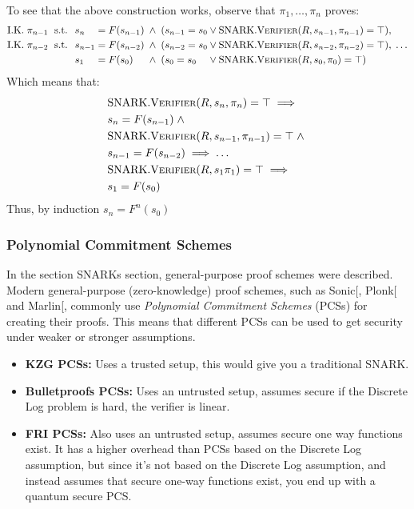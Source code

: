 \documentclass[
]{article}
\providecommand{\tightlist}{%
  \setlength{\itemsep}{0pt}\setlength{\parskip}{0pt}}
\newcommand*{\Verifier}{\mathrm{\text{V\scriptsize ERIFIER}}}
\newcommand*{\SNARKVerifier}{\mathrm{\text{SNARK}}.\Verifier}
\begin{document}
To see that the above construction works, observe that \(\pi_1, \dots,
\pi_n\) proves: \[
\begin{alignedat}{7}
  &\text{I.K.} \; \pi_{n-1} \; &&\text{ s.t. } \; &&s_n     &&= F(s_{n-1}) \; &&\land \; (s_{n-1} = s_0  &&\lor \SNARKVerifier(R, s_{n-1}, \pi_{n-1}) = \top), \\
  &\text{I.K.} \; \pi_{n-2} \; &&\text{ s.t. } \; &&s_{n-1} &&= F(s_{n-2}) \; &&\land \; (s_{n-2} = s_0  &&\lor \SNARKVerifier(R, s_{n-2}, \pi_{n-2}) = \top), \; \dots \\
  &                            &&              \; &&s_1     &&= F(s_0)     \; &&\land \; (s_0 = s_0      &&\lor \SNARKVerifier(R, s_0, \pi_0) = \top)
\end{alignedat}
\] Which means that: \[
\begin{alignedat}{4}
  &\SNARKVerifier(R, s_n, \pi_n) = \top \implies \\
  &s_n = F(s_{n-1}) \; \land \; \\
  &\SNARKVerifier(R, s_{n-1}, \pi_{n-1}) = \top \; \land \; \\
  &s_{n-1} = F(s_{n-2}) \implies \dots \\
  &\SNARKVerifier(R, s_1 \pi_1) = \top \implies \\
  &s_1 = F(s_0)
\end{alignedat}
\] Thus, by induction \(s_n = F^n(s_0)\)

\subsubsection{Polynomial Commitment
Schemes}\label{polynomial-commitment-schemes}

In the section SNARKs section, general-purpose proof schemes were
described. Modern general-purpose (zero-knowledge) proof schemes, such
as Sonic{[}\citeproc{ref-sonic}{Maller et al. 2019}{]},
Plonk{[}\citeproc{ref-plonk}{Gabizon et al. 2019}{]} and
Marlin{[}\citeproc{ref-marlin}{Chiesa et al. 2019}{]}, commonly use
\emph{Polynomial Commitment Schemes} (PCSs) for creating their proofs.
This means that different PCSs can be used to get security under weaker
or stronger assumptions.

\begin{itemize}
\tightlist
\item
  \textbf{KZG PCSs:} Uses a trusted setup, this would give you a
  traditional SNARK.
\item
  \textbf{Bulletproofs PCSs:} Uses an untrusted setup, assumes secure if
  the Discrete Log problem is hard, the verifier is linear.
\item
  \textbf{FRI PCSs:} Also uses an untrusted setup, assumes secure one
  way functions exist. It has a higher overhead than PCSs based on the
  Discrete Log assumption, but since it's not based on the Discrete Log
  assumption, and instead assumes that secure one-way functions exist,
  you end up with a quantum secure PCS.
\end{itemize}
\end{document}
